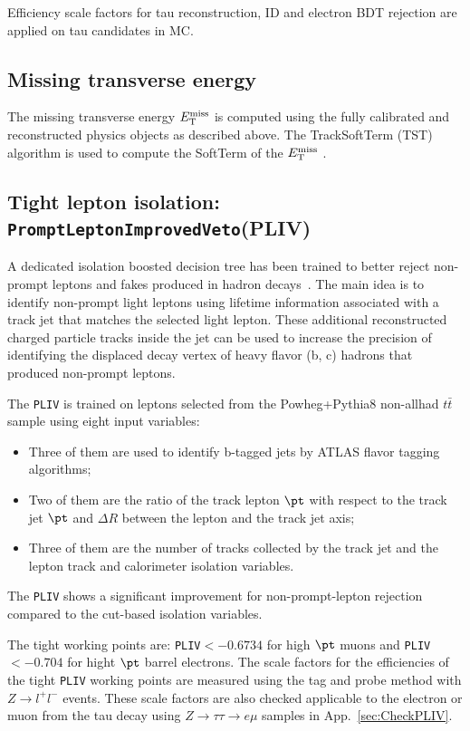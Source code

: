 Efficiency scale factors for tau reconstruction, ID and electron BDT rejection \cite{TauCP} are applied on tau candidates in MC.

\subsection{Missing transverse energy}
The missing transverse energy $E_{\text{T}}^{\text{miss}}$ is computed using the fully calibrated and reconstructed physics objects as described above. The TrackSoftTerm (TST) algorithm is used to compute the SoftTerm of the $E_{\text{T}}^{\text{miss}}$ \cite{MET}. 

\subsection{Tight lepton isolation: \texttt{PromptLeptonImprovedVeto}(PLIV)}
\label{sec:Pliv}
A dedicated isolation boosted decision tree has been trained to better reject non-prompt leptons and fakes produced in hadron decays~\cite{ATL-COM-PHYS-2018-410}. The main idea is to identify non-prompt light leptons using lifetime information associated with a track jet that matches the selected light lepton. These additional reconstructed charged particle tracks inside the jet can be used to increase the precision of identifying the displaced decay vertex of heavy flavor (b, c) hadrons that produced non-prompt leptons.

The \texttt{PLIV} is trained on leptons selected from the Powheg+Pythia8 non-allhad $t\bar t$ sample using eight input variables:
\begin{itemize}
\item Three of them are used to identify b-tagged jets by ATLAS flavor tagging algorithms;
\item Two of them are the ratio of the track lepton $\pt$ with respect to the track jet $\pt$ and $\Delta R$ between the lepton and the track jet axis;
\item Three of them are the number of tracks collected by the track jet and the lepton track and calorimeter isolation variables. 
\end{itemize}

The \texttt{PLIV} shows a significant improvement for non-prompt-lepton rejection compared to the cut-based isolation variables.

The tight working points are: \texttt{PLIV}$<-0.6734$ for high $\pt$ muons and \texttt{PLIV}$<-0.704$ for hight $\pt$ barrel electrons. The scale factors for the efficiencies of the tight \texttt{PLIV} working points are measured using the tag and probe method with $Z\rightarrow l^+l^-$ events. These scale
factors are also checked applicable to the electron or muon from the tau decay using $Z\rightarrow\tau\tau\rightarrow e\mu$ samples in App.~\ref{sec:CheckPLIV}. 

